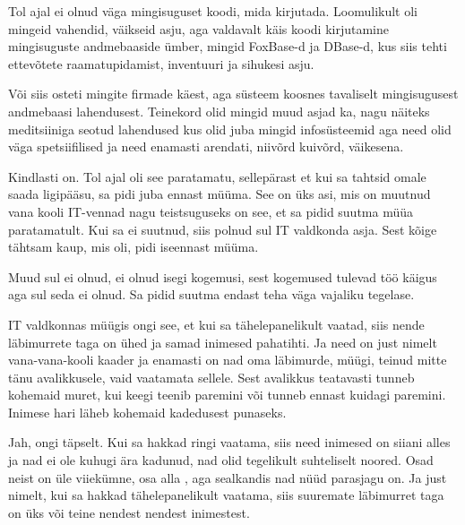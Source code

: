 Tol ajal ei olnud väga mingisuguset koodi, mida kirjutada. Loomulikult oli mingeid vahendid, väikseid asju, aga valdavalt käis koodi kirjutamine mingisuguste andmebaaside ümber, mingid FoxBase-d ja DBase-d, kus siis tehti ettevõtete  raamatupidamist,  inventuuri ja sihukesi asju. 


Või siis osteti mingite firmade käest, aga süsteem koosnes tavaliselt mingisugusest andmebaasi lahendusest. Teinekord olid mingid muud asjad ka, nagu näiteks  meditsiiniga seotud lahendused kus olid juba mingid infosüsteemid aga need olid väga spetsiifilised ja need enamasti arendati, niivõrd kuivõrd, väikesena.


Kindlasti on. Tol ajal oli see paratamatu, sellepärast et kui sa tahtsid omale saada ligipääsu, sa pidi juba ennast müüma. See on üks asi, mis on muutnud  vana kooli IT-vennad nagu teistsuguseks on see, et sa pidid suutma müüa paratamatult. Kui sa ei suutnud, siis polnud sul IT valdkonda asja. Sest kõige tähtsam kaup, mis oli, pidi  iseennast müüma.


Muud sul ei olnud, ei olnud isegi kogemusi, sest kogemused tulevad töö käigus aga sul seda ei olnud. Sa pidid suutma endast teha väga vajaliku tegelase.


IT valdkonnas müügis ongi see, et kui sa tähelepanelikult vaatad, siis nende läbimurrete taga on ühed ja samad inimesed pahatihti. Ja  need on just nimelt vana-vana-kooli kaader ja enamasti on nad oma läbimurde, müügi, teinud mitte tänu  avalikkusele, vaid vaatamata sellele. Sest avalikkus teatavasti tunneb kohemaid muret, kui keegi teenib paremini või tunneb ennast kuidagi paremini. Inimese hari läheb kohemaid kadedusest punaseks.
               
  
Jah, ongi täpselt. Kui sa hakkad ringi vaatama, siis need inimesed on siiani alles ja nad ei ole kuhugi ära kadunud, nad olid tegelikult suhteliselt noored. Osad neist on üle viiekümne, osa alla , aga sealkandis nad nüüd parasjagu on. Ja just nimelt, kui sa hakkad tähelepanelikult vaatama, siis suuremate läbimurret taga on üks või teine nendest nendest inimestest.
                 
